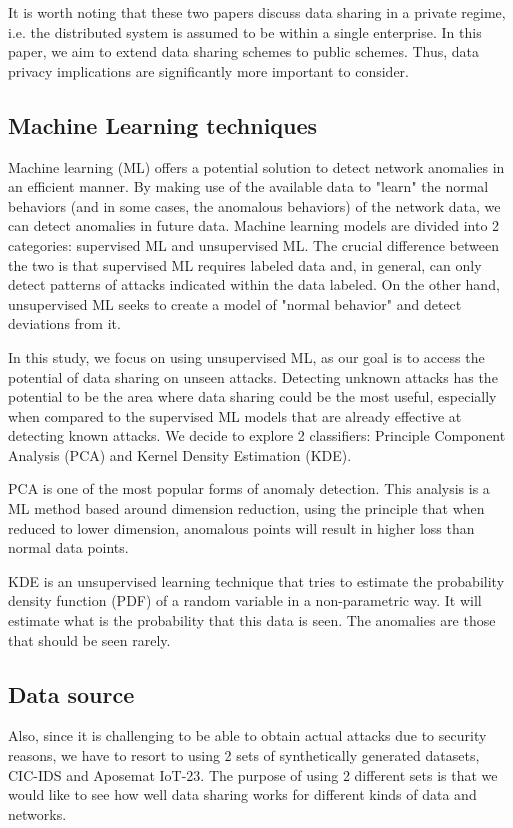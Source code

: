 \begin{background}
It is worth noting that these two papers discuss data sharing in a private regime, i.e. the distributed system is assumed to be within a single enterprise. In this paper, we aim to extend data sharing schemes to public schemes. Thus, data privacy implications are significantly more important to consider.

\subsection{Machine Learning techniques}
Machine learning (ML) offers a potential solution to detect network anomalies in an efficient manner. By making use of the available data to "learn" the normal behaviors (and in some cases, the anomalous behaviors) of the network data, we can detect anomalies in future data. 
Machine learning models are divided into 2 categories: supervised ML and unsupervised ML. The crucial difference between the two is that supervised ML requires labeled data and, in general, can only detect patterns of attacks indicated within the data labeled. On the other hand, unsupervised ML seeks to create a model of "normal behavior" and detect deviations from it.

In this study, we focus on using unsupervised ML, as our goal is to access the potential of data sharing on unseen attacks. Detecting unknown attacks has the potential to be the area where data sharing could be the most useful, especially when compared to the supervised ML models that are already effective at detecting known attacks. We decide to explore 2 classifiers: Principle Component Analysis (PCA) and Kernel Density Estimation (KDE). 

PCA is one of the most popular forms of anomaly detection. This analysis is a ML method based around dimension reduction, using the principle that when reduced to lower dimension, anomalous points will result in higher loss than normal data points.

KDE is an unsupervised learning technique that tries to estimate the probability density function (PDF) of a random variable in a non-parametric way. It will estimate what is the probability that this data is seen. The anomalies are those that should be seen rarely.

\subsection{Data source}

Also, since it is challenging to be able to obtain actual attacks due to security reasons, we have to resort to using 2 sets of synthetically generated datasets, CIC-IDS and Aposemat IoT-23. The purpose of using 2 different sets is that we would like to see how well data sharing works for different kinds of data and networks.  


\end{background}
